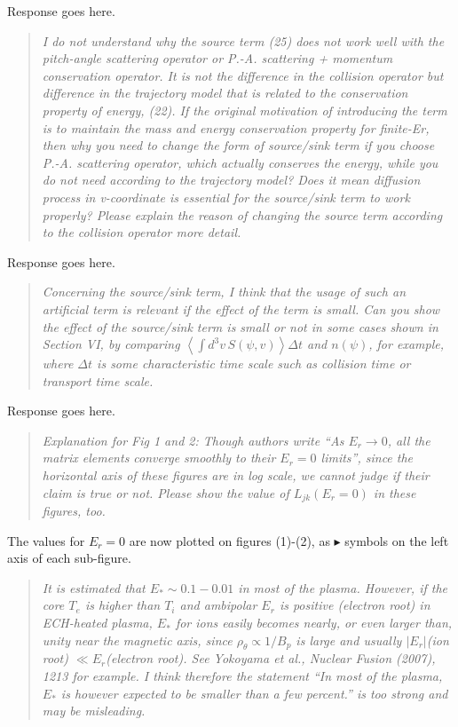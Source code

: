 \documentclass[11pt]{article}
\newenvironment{referee}{\begin{quote}\it\color{Blue}}{\end{quote}}
\begin{document}
Response goes here.

\begin{referee}
I do not understand why the source term (25) does not work well with the pitch-angle scattering
operator or P.-A. scattering + momentum conservation operator. It is not the difference in the
collision operator but difference in the trajectory model that is related to the conservation
property of energy, (22). If the original motivation of introducing the term is to maintain the
mass and energy conservation property for finite-Er, then why you need to change the form of
source/sink term if you choose P.-A. scattering operator, which actually conserves the energy,
while you do not need according to the trajectory model? Does it mean diffusion process in
v-coordinate is essential for the source/sink term to work properly?
Please explain the reason of changing the source term according to the collision operator more
detail.
\end{referee}

Response goes here.

\begin{referee}
Concerning the source/sink term, I think that the usage of such an artificial term is relevant if
the effect of the term is small. Can you show the effect of the source/sink term is small or not in
some cases shown in Section VI, by comparing $\left< \int d^3v\, S(\psi,v) \right> \Delta t$ and $n(\psi)$, for example, where
$\Delta t$ is some characteristic time scale such as collision time or transport time scale.
\end{referee}

Response goes here.

\begin{referee}
Explanation for Fig 1 and 2: Though authors write ``As $E_r \to 0$, all the matrix elements converge
smoothly to their $E_r = 0$ limits'', since the horizontal axis of these figures are in log scale, we
cannot judge if their claim is true or not. Please show the value of $L_{jk}(E_r=0)$ in these figures,
too.
\end{referee}

The values for $E_r=0$ are now plotted on figures (1)-(2), as $\blacktriangleright$ symbols on the left axis
of each sub-figure.

\begin{referee}
It is estimated that $E_* \sim 0.1 - 0.01$ in most of the plasma. However, if the core $T_e$ is higher than
$T_i$ and ambipolar $E_r$ is positive (electron root) in ECH-heated plasma, $E_*$ for ions easily becomes
nearly, or even larger than, unity near the magnetic axis, since $\rho_\theta \propto 1/B_p$ is large and usually
$|E_r|$(ion root) $\ll E_r$(electron root). See Yokoyama et al., Nuclear Fusion (2007), 1213 for example.
I think therefore the statement ``In most of the plasma, $E_*$ is however expected to be smaller
than a few percent.'' is too strong and may be misleading.
\end{referee}
\end{document}
